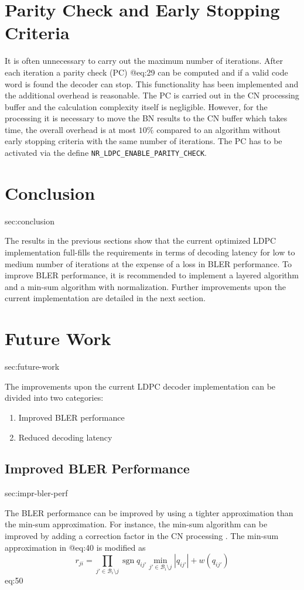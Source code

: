 \documentclass{article}
\def\Bcal{\mathcal{B}}
\newcommand{\sgn}{\operatorname{sgn}}
\begin{document}
\section{Parity Check and Early Stopping Criteria}
It is often unnecessary to carry out the maximum number of iterations. After each iteration a parity check (PC) @eq:29 can be computed and if a valid code word is found the decoder can stop. This functionality has been implemented and the additional overhead is reasonable. The PC is carried out in the CN processing buffer and the calculation complexity itself is negligible. However, for the processing it is necessary to move the BN results to the CN buffer which takes time, the overall overhead is at most $10\%$ compared to an algorithm without early stopping criteria with the same number of iterations. The PC has to be activated via the define \texttt{NR\_LDPC\_ENABLE\_PARITY\_CHECK}.


\section{Conclusion}{sec:conclusion}

The results in the previous sections show that the current optimized LDPC implementation full-fills the requirements in terms of decoding latency for low to medium number of iterations at the expense of a loss in BLER performance. To improve BLER performance, it is recommended to implement a layered algorithm and a min-sum algorithm with normalization. Further improvements upon the current implementation are detailed in the next section.

\newpage
\section{Future Work}{sec:future-work}

The improvements upon the current LDPC decoder implementation can be divided into two categories:
\begin{enumerate}
\item Improved BLER performance
\item Reduced decoding latency
\end{enumerate}

\subsection{Improved BLER Performance}{sec:impr-bler-perf}

The BLER performance can be improved by using a tighter approximation than the min-sum approximation. For instance, the min-sum algorithm can be improved by adding a correction factor in the CN processing . The min-sum approximation in @eq:40 is modified as
\begin{equation}
  r_{ji} = \prod_{j'\in\Bcal_i\setminus j}\sgn q_{ij'}\min_{j'\in\Bcal_i\setminus j} |q_{ij'}| + w(q_{ij'})
\end{equation}{eq:50}
\end{document}
